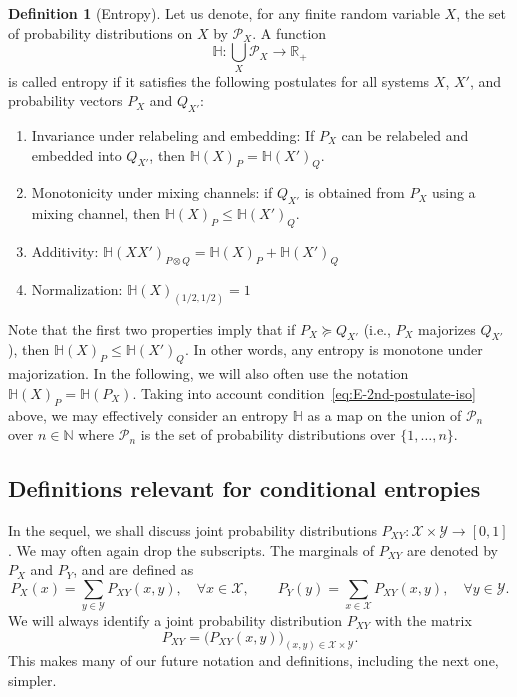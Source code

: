 \documentclass[aps,pra,11pt,onecolumn,nofootinbib,tightenlines]{revtex4-2}
\theoremstyle{definition}
\newtheorem{definition}[theorem]{Definition}
\renewcommand{\H}{\mathbb{H}}
\newcommand{\X}{\mathcal{X}}
\newcommand{\Y}{\mathcal{Y}}
\newcommand{\mc}[1]{\mathcal{#1}}
\begin{document}
\begin{definition}[Entropy]
\label{def: Entropy}
Let us denote, for any finite random variable $X$, the set of probability distributions on $X$ by $\mc P_X$. A function
\begin{equation}
\H : \bigcup_{X} \mc P_{X} \rightarrow \mathbb{R}_+
\label{eq:ent-gen-def-1st}
\end{equation}
is called entropy if it satisfies the following postulates for all systems $X$, $X'$, and probability vectors $P_{X}$ and $Q_{X'}$:
\begin{enumerate}
    \item Invariance under relabeling and embedding: If $P_X$ can be relabeled and embedded into $Q_{X'}$, then $\H(X)_P=\H(X')_Q$. 
     \label{eq:E-2nd-postulate-iso}
    \item Monotonicity under mixing channels: if $Q_{X'}$ is obtained from $P_{X}$ using a mixing channel, then $ \H(X)_{P} \leq \H(X')_{Q}$.
    \label{eq:E-1st-postulate-mono} 
    \item Additivity: $  \H(XX')_{P \otimes Q} = \H(X)_{P} + \H(X')_{Q}$
     \label{eq:E-2nd-postulate-add}
    \item Normalization: $ \H(X)_{(1/2,1/2)} = 1$
    \label{eq:E-4-postulate-normalization}
\end{enumerate}
\end{definition}
Note that the first two properties imply that if \(P_{X} \succeq Q_{X'}\) (i.e., \(P_X\) majorizes \(Q_{X'}\)), then \(\H(X)_P \leq \H(X')_Q\). In other words, any entropy is monotone under majorization. In the following, we will 
also often use the notation $\H(X)_P=\H(P_X)$. Taking into account condition~\ref{eq:E-2nd-postulate-iso} above, we may effectively consider an entropy $\H$ as a map on the union of $\mc P_n$ over $n\in\mathbb{N}$ where $\mc P_n$ is the set of probability distributions over $\{1,\ldots,n\}$. 

\subsection{Definitions relevant for conditional entropies}

In the sequel, we shall discuss joint probability distributions $P_{XY}:\X\times\Y\to[0,1]$. We may often again drop the subscripts. 
The marginals of \(P_{XY}\) are denoted by \(P_X\) and \(P_Y\), and are defined as
\begin{equation}
P_X(x) = \sum_{y \in \mathcal{Y}} P_{XY}(x,y), \quad \forall x \in \mathcal{X}, \qquad
P_Y(y) = \sum_{x \in \mathcal{X}} P_{XY}(x,y), \quad \forall y \in \mathcal{Y}.
\end{equation}
We will always identify a joint probability distribution $P_{XY}$ with the matrix
\begin{equation}
P_{XY}=\big(P_{XY}(x,y)\big)_{(x,y)\in\X\times\Y}.
\end{equation}
This makes many of our future notation and definitions, including the next one, simpler.
\end{document}
